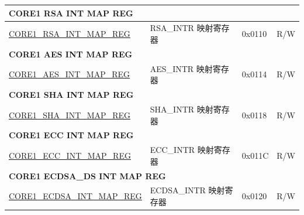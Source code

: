\begin{longtable}{ | p{7.5cm} | p{7.2cm} | p{1.3cm} | p{1cm} | }
\multicolumn{4}{|l|}{\textbf{CORE1 RSA INT MAP REG}} \\ \hline
\hyperref[regdesc:CORE1RSAINTMAPREG]{CORE1\_RSA\_INT\_MAP\_REG} & RSA\_INTR 映射寄存器 & 0x0110 & R/W \\ \hline
\multicolumn{4}{|l|}{\textbf{CORE1 AES INT MAP REG}} \\ \hline
\hyperref[regdesc:CORE1AESINTMAPREG]{CORE1\_AES\_INT\_MAP\_REG} & AES\_INTR 映射寄存器 & 0x0114 & R/W \\ \hline
\multicolumn{4}{|l|}{\textbf{CORE1 SHA INT MAP REG}} \\ \hline
\hyperref[regdesc:CORE1SHAINTMAPREG]{CORE1\_SHA\_INT\_MAP\_REG} & SHA\_INTR 映射寄存器 & 0x0118 & R/W \\ \hline
\multicolumn{4}{|l|}{\textbf{CORE1 ECC INT MAP REG}} \\ \hline
\hyperref[regdesc:CORE1ECCINTMAPREG]{CORE1\_ECC\_INT\_MAP\_REG} & ECC\_INTR 映射寄存器 & 0x011C & R/W \\ \hline
\multicolumn{4}{|l|}{\textbf{CORE1 ECDSA\_DS INT MAP REG}} \\ \hline
\hyperref[regdesc:CORE1ECDSAINTMAPREG]{CORE1\_ECDSA\_INT\_MAP\_REG} & ECDSA\_INTR 映射寄存器 & 0x0120 & R/W \\ \hline


\end{longtable}
